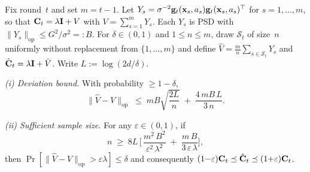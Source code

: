 \documentclass[twoside]{article}
\begin{document}
\begin{lemma}\label{lem:subsample}
Fix round~$t$ and set $m=t{-}1$.
Let $Y_s = \sigma^{-2}\mathbf{g}_t(\mathbf{x}_s,a_s)\mathbf{g}_t(\mathbf{x}_s,a_s)^\top$ for
$s=1,\dots,m$, so that $\mathbf{C}_t = \lambda\mathbf{I} + V$ with $V=\sum_{s=1}^m Y_s$.
Each $Y_s$ is PSD with $\|Y_s\|_{\mathrm{op}}\le G^2/\sigma^2 =: B$.
For $\delta\in(0,1)$ and $1\le n\le m$, draw $\mathcal{S}_t$ of size~$n$
uniformly without replacement from
$\{1,\dots,m\}$ and define $\hat V = \tfrac{m}{n}\sum_{s\in\mathcal{S}_t}Y_s$
and $\hat{\mathbf{C}}_t = \lambda\mathbf{I} + \hat V$.
Write $L:=\log(2d/\delta)$.

\emph{(i) Deviation bound.}
With probability $\ge 1-\delta$,
\begin{equation}\label{eq:subsample-dev}
  \|\hat V - V\|_{\mathrm{op}}
  \;\le\;
  mB\sqrt{\frac{2L}{n}}
  \;+\;
  \frac{4\,mB\,L}{3\,n}.
\end{equation}

\emph{(ii) Sufficient sample size.}
For any $\varepsilon\in(0,1)$, if
\begin{equation}\label{eq:subsample-n}
  n \;\ge\; 8L\,\biggl[\,
    \frac{m^2\,B^2}{\varepsilon^2\,\lambda^2}
    \;+\;
    \frac{m\,B}{3\,\varepsilon\,\lambda}
  \biggr],
\end{equation}
then $\Pr[\|\hat V - V\|_{\mathrm{op}} > \varepsilon\lambda] \le \delta$
and consequently
$(1{-}\varepsilon)\mathbf{C}_t\preceq\hat{\mathbf{C}}_t\preceq(1{+}\varepsilon)\mathbf{C}_t$.
\end{lemma}
\end{document}
